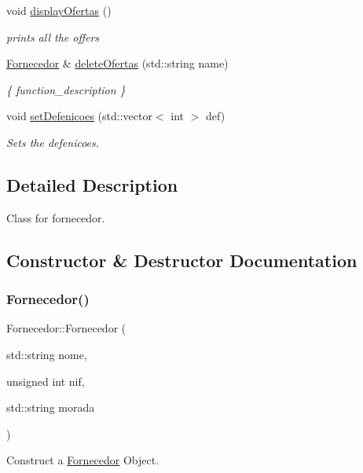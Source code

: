 \begin{DoxyCompactItemize}
void \hyperlink{classFornecedor_a858875f921d2eebb652c4b7628f95c71}{display\+Ofertas} ()
\begin{DoxyCompactList}\small\item\em prints all the offers \end{DoxyCompactList}\item 
\hyperlink{classFornecedor}{Fornecedor} \& \hyperlink{classFornecedor_a55df81a932be74bc25122639c64ab5a0}{delete\+Ofertas} (std\+::string name)
\begin{DoxyCompactList}\small\item\em \{ function\+\_\+description \} \end{DoxyCompactList}\item 
void \hyperlink{classFornecedor_a63bb5795c45d195995de437620503d98}{set\+Defenicoes} (std\+::vector$<$ int $>$ def)
\begin{DoxyCompactList}\small\item\em Sets the defenicoes. \end{DoxyCompactList}\end{DoxyCompactItemize}


\subsection{Detailed Description}
Class for fornecedor. 

\subsection{Constructor \& Destructor Documentation}
\mbox{\label{classFornecedor_a0cbc4556289cc946756039ab0da52756}} 
\subsubsection{\texorpdfstring{Fornecedor()}{Fornecedor()}}
{\footnotesize\ttfamily Fornecedor\+::\+Fornecedor (\begin{DoxyParamCaption}\item[{std\+::string}]{nome,  }\item[{unsigned int}]{nif,  }\item[{std\+::string}]{morada }\end{DoxyParamCaption})}



Construct a \hyperlink{classFornecedor}{Fornecedor} Object. 


